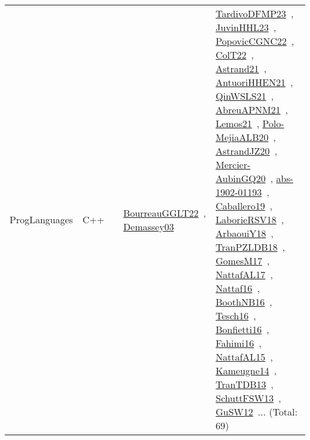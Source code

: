 {\begin{longtable}{lp{3cm}>{\raggedright\arraybackslash}p{6cm}>{\raggedright\arraybackslash}p{6cm}>{\raggedright\arraybackslash}p{8cm}}
ProgLanguages & C++ &  & \href{works/BourreauGGLT22.pdf}{BourreauGGLT22}~\cite{BourreauGGLT22}, \href{works/Demassey03.pdf}{Demassey03}~\cite{Demassey03} & \href{works/TardivoDFMP23.pdf}{TardivoDFMP23}~\cite{TardivoDFMP23}, \href{works/JuvinHHL23.pdf}{JuvinHHL23}~\cite{JuvinHHL23}, \href{works/PopovicCGNC22.pdf}{PopovicCGNC22}~\cite{PopovicCGNC22}, \href{works/ColT22.pdf}{ColT22}~\cite{ColT22}, \href{works/Astrand21.pdf}{Astrand21}~\cite{Astrand21}, \href{works/AntuoriHHEN21.pdf}{AntuoriHHEN21}~\cite{AntuoriHHEN21}, \href{works/QinWSLS21.pdf}{QinWSLS21}~\cite{QinWSLS21}, \href{works/AbreuAPNM21.pdf}{AbreuAPNM21}~\cite{AbreuAPNM21}, \href{works/Lemos21.pdf}{Lemos21}~\cite{Lemos21}, \href{works/Polo-MejiaALB20.pdf}{Polo-MejiaALB20}~\cite{Polo-MejiaALB20}, \href{works/AstrandJZ20.pdf}{AstrandJZ20}~\cite{AstrandJZ20}, \href{works/Mercier-AubinGQ20.pdf}{Mercier-AubinGQ20}~\cite{Mercier-AubinGQ20}, \href{works/abs-1902-01193.pdf}{abs-1902-01193}~\cite{abs-1902-01193}, \href{works/Caballero19.pdf}{Caballero19}~\cite{Caballero19}, \href{works/LaborieRSV18.pdf}{LaborieRSV18}~\cite{LaborieRSV18}, \href{works/ArbaouiY18.pdf}{ArbaouiY18}~\cite{ArbaouiY18}, \href{works/TranPZLDB18.pdf}{TranPZLDB18}~\cite{TranPZLDB18}, \href{works/GomesM17.pdf}{GomesM17}~\cite{GomesM17}, \href{works/NattafAL17.pdf}{NattafAL17}~\cite{NattafAL17}, \href{works/Nattaf16.pdf}{Nattaf16}~\cite{Nattaf16}, \href{works/BoothNB16.pdf}{BoothNB16}~\cite{BoothNB16}, \href{works/Tesch16.pdf}{Tesch16}~\cite{Tesch16}, \href{works/Bonfietti16.pdf}{Bonfietti16}~\cite{Bonfietti16}, \href{works/Fahimi16.pdf}{Fahimi16}~\cite{Fahimi16}, \href{works/NattafAL15.pdf}{NattafAL15}~\cite{NattafAL15}, \href{works/Kameugne14.pdf}{Kameugne14}~\cite{Kameugne14}, \href{works/TranTDB13.pdf}{TranTDB13}~\cite{TranTDB13}, \href{works/SchuttFSW13.pdf}{SchuttFSW13}~\cite{SchuttFSW13}, \href{works/GuSW12.pdf}{GuSW12}~\cite{GuSW12}... (Total: 69)\\

\end{longtable}}
